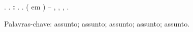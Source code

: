 \newpage
\begin{Spacing}{1}

\begin{resumo}[RESUMO]

\noindent
{\imprimirautorcitacao}. 
   \ifx\imprimirtitulo\empty   
      \textbf{\imprimirtitulo}.
   \else
      \textbf{{\imprimirtitulo}: }{\imprimirsubtitulo}.
   \fi
{\imprimirdata}. {\imprimirprojeto} ({\imprimirtituloAcademico} em {\imprimirprograma}) -- {\imprimirInstituicaoCurto}, {\imprimirInstituicaoCampus}, {\imprimirlocal}, {\imprimirdata}.

\vspace{1cm}




\lipsum[10] \lipsum[11] \lipsum[12] \lipsum[13]

\vspace{1cm}
Palavras-chave: assunto; assunto; assunto; assunto; assunto.
 
\end{resumo}


\end{Spacing}







